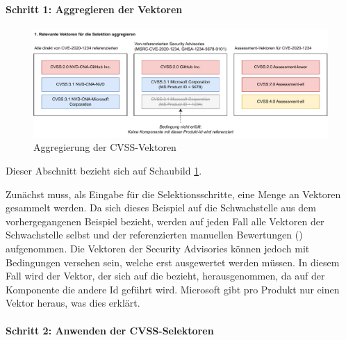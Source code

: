 \paragraph{Schritt 1: Aggregieren der Vektoren} \label{par:projektbericht-loesungsweg-cvss-selection-example-step-1}

\begin{figure}[htbp] %
    \centering
    \includegraphics[width=1\textwidth, keepaspectratio]{res/grafiken/cvss-selection-process-selection-1}
    \caption{Aggregierung der CVSS-Vektoren}
    \label{fig:cvss-selection-process-selection-1}
\end{figure}

Dieser Abschnitt bezieht sich auf Schaubild \ref{fig:cvss-selection-process-selection-1}.

Zunächst muss, als Eingabe für die Selektionsschritte, eine Menge an Vektoren gesammelt werden.
Da sich dieses Beispiel auf die Schwachstelle  aus dem vorhergegangenen Beispiel bezieht, werden auf jeden Fall alle Vektoren der Schwachstelle selbst und der referenzierten manuellen Bewertungen () aufgenommen.
Die Vektoren der Security Advisories können jedoch mit Bedingungen versehen sein, welche erst ausgewertet werden müssen.
In diesem Fall wird der Vektor, der sich auf die  bezieht, herausgenommen, da auf der Komponente die andere Id  geführt wird.
Microsoft gibt pro Produkt nur einen Vektor heraus, was dies erklärt.

\paragraph{Schritt 2: Anwenden der CVSS-Selektoren} \label{par:projektbericht-loesungsweg-cvss-selection-example-step-2}

